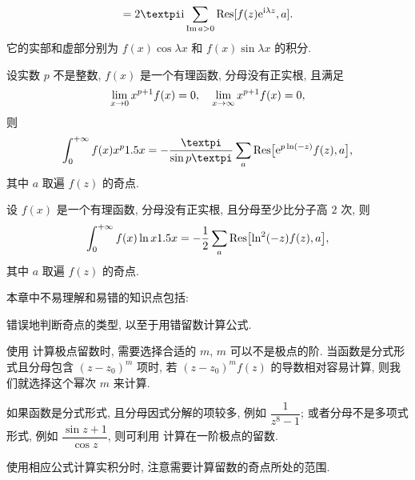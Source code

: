 \begin{conclusion}
\begin{conclusion}
\[      =2\cpi\ii\sum_{\Im a>0}\Res[f(z)\ee^{\ii \lambda z},a].
    \]
    它的实部和虚部分别为 $f(x)\cos\lambda x$ 和 $f(x)\sin\lambda x$ 的积分.
    \item 设实数 $p$ 不是整数, $f(x)$ 是一个有理函数, 分母没有正实根, 且满足
    \[
      \lim_{x\rightarrow 0} x^{p+1}f(x)=0,\quad
      \lim_{x\rightarrow \infty} x^{p+1}f(x)=0,
    \]
    则
    \[
       \intf f(x)x^p\d x
      =-\frac{\cpi}{\sin{p\cpi}}\sum_a \Res\bigl[\ee^{p\ln(-z)}f(z),a\bigr],
    \]
    其中 $a$ 取遍 $f(z)$ 的奇点.
    \item 设 $f(x)$ 是一个有理函数, 分母没有正实根, 且分母至少比分子高 $2$ 次, 则
    \[
      \displaystyle\int_0^{+\infty} f(x)\ln x1.5 x
      =-\frac12 \sum_a {\mathrm{Res}}\bigl[\ln^2(-z)f(z),a\bigr],
    \]
    其中 $a$ 取遍 $f(z)$ 的奇点.
  \end{conclusion}
\end{conclusion}

本章中不易理解和易错的知识点包括:
\begin{enuma}
  \item 错误地判断奇点的类型, 以至于用错留数计算公式.
  \item 使用 计算极点留数时, 需要选择合适的 $m$, $m$ 可以不是极点的阶.
  当函数是分式形式且分母包含 $(z-z_0)^m$ 项时, 若 $(z-z_0)^mf(z)$ 的导数相对容易计算, 则我们就选择这个幂次 $m$ 来计算.
  \item 如果函数是分式形式, 且分母因式分解的项较多, 例如 $\dfrac1{z^8-1}$; 或者分母不是多项式形式, 例如 $\dfrac{\sin z+1}{\cos z}$, 则可利用 计算在一阶极点的留数.
  \smallskip
  \item 使用相应公式计算实积分时, 注意需要计算留数的奇点所处的范围.
\end{enuma}



